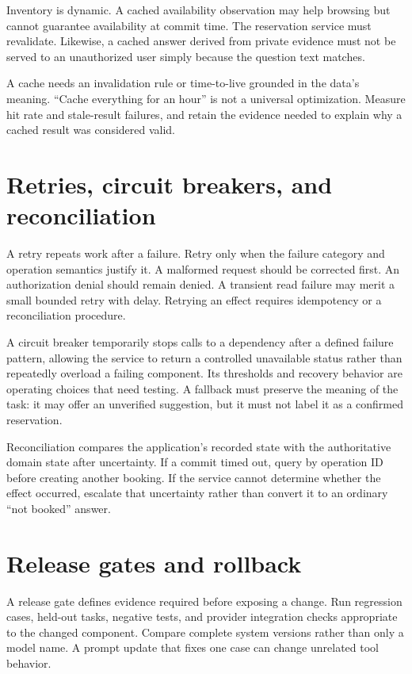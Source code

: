 Inventory is dynamic. A cached availability observation may help browsing but cannot guarantee availability at commit time. The reservation service must revalidate. Likewise, a cached answer derived from private evidence must not be served to an unauthorized user simply because the question text matches.

A cache needs an invalidation rule or time-to-live grounded in the data's meaning. “Cache everything for an hour” is not a universal optimization. Measure hit rate and stale-result failures, and retain the evidence needed to explain why a cached result was considered valid.

\section{Retries, circuit breakers, and reconciliation}
A retry repeats work after a failure. Retry only when the failure category and operation semantics justify it. A malformed request should be corrected first. An authorization denial should remain denied. A transient read failure may merit a small bounded retry with delay. Retrying an effect requires idempotency or a reconciliation procedure.

A circuit breaker temporarily stops calls to a dependency after a defined failure pattern, allowing the service to return a controlled unavailable status rather than repeatedly overload a failing component. Its thresholds and recovery behavior are operating choices that need testing. A fallback must preserve the meaning of the task: it may offer an unverified suggestion, but it must not label it as a confirmed reservation.

Reconciliation compares the application's recorded state with the authoritative domain state after uncertainty. If a commit timed out, query by operation ID before creating another booking. If the service cannot determine whether the effect occurred, escalate that uncertainty rather than convert it to an ordinary “not booked” answer.

\section{Release gates and rollback}
A release gate defines evidence required before exposing a change. Run regression cases, held-out tasks, negative tests, and provider integration checks appropriate to the changed component. Compare complete system versions rather than only a model name. A prompt update that fixes one case can change unrelated tool behavior.

